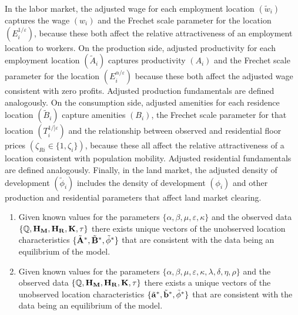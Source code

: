 In the labor market, the adjusted wage for each employment location $(\tilde{w}_i)$ captures the wage $(w_i)$ and the Frechet scale parameter for the location $(E_i^{1 / \varepsilon})$, because these both affect the relative attractiveness of an employment location to workers. On the production side, adjusted productivity for each employment location $(\tilde{A}_i)$ captures productivity $(A_i)$ and the Frechet scale parameter for the location $(E_i^{\alpha / \varepsilon})$ because these both affect the adjusted wage consistent with zero profits. Adjusted production fundamentals are defined analogously. On the consumption side, adjusted amenities for each residence location $(\tilde{B}_i)$ capture amenities $(B_i)$, the Frechet scale parameter for that location $(T_i^{1 / ]\varepsilon})$ and the relationship between observed and residential floor prices $(\zeta_{Ri} \in \{1, \zeta_i\})$, because these all affect the relative attractiveness of a location consistent with population mobility. Adjusted residential fundamentals are defined analogously. Finally, in the land market, the adjusted density of development $(\tilde{\phi}_i)$ includes the density of development $(\phi_i)$ and other production and residential parameters that affect land market clearing.

\begin{proposition}
  \begin{enumerate}
    \item Given known values for the parameters $\{\alpha, \beta, \mu, \varepsilon, \kappa\}$ and the observed data $\{\mathbb{Q}, \bf{H}_M, \bf{H}_R, \bf{K}, \bf{\tau}\}$ there exists unique vectors of the unobserved location characteristics $\{\tilde{\bf{A}}^*, \tilde{\bf{B}}^*, \tilde{\bf{\phi}}^*\}$ that are consistent with the data being an equilibrium of the model.
    \item Given known values for the parameters $\{\alpha, \beta, \mu, \varepsilon, \kappa, \lambda, \delta, \eta, \rho\}$ and the observed data $\{\mathbb{Q}, \bf{H}_M, \bf{H}_R, \bf{K}, \bf{\tau}\}$ there exists a unique vectors of the unobserved location characteristics $\{\tilde{\bf{a}}^*, \tilde{\bf{b}}^*, \tilde{\bf{\phi}}^*\}$ that are consistent with the data being an equilibrium of the model.
  \end{enumerate}
\end{proposition}


















